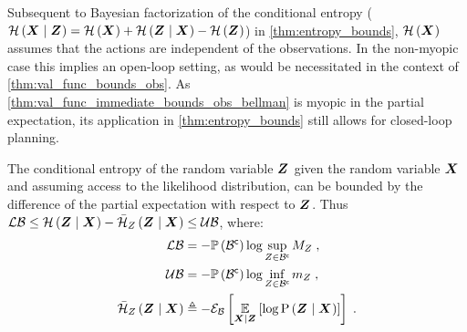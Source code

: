 Subsequent to Bayesian factorization of the conditional entropy ($\mathcal{H}\left({\boldsymbol X_{}}\mid{\ensuremath{\boldsymbol Z_{}}}\right)=\mathcal{H}\left({\boldsymbol X_{}}\right)+\mathcal{H}\left({\boldsymbol Z_{}}\mid{\ensuremath{\boldsymbol X_{}}}\right)-\mathcal{H}\left({\boldsymbol Z_{}}\right)$) in \cref{thm:entropy_bounds}, $\mathcal{H}\left({\boldsymbol X_{}}\right)$ assumes that the actions are independent of the observations. In the non-myopic case this implies an open-loop setting, as would be necessitated in the context of \cref{thm:val_func_bounds_obs}.  As \cref{thm:val_func_immediate_bounds_obs_bellman} is myopic in the partial expectation, its application in \cref{thm:entropy_bounds} still allows for closed-loop planning.

\begin{propositionE}
	\label{thm:observation_bounds}
	The conditional entropy of the random variable $\boldsymbol Z_{}$ given the random variable $\boldsymbol X_{}$ and assuming access to the likelihood distribution, can be bounded by the difference of the partial expectation with respect to $\boldsymbol Z_{}$. Thus $\operatorname*{\mathcal{LB}}\leq\mathcal{H}\left({\boldsymbol Z_{}}\mid{\ensuremath{\boldsymbol X_{}}}\right)-\bar{\mathcal{H}}_{Z_{}}\left({\boldsymbol Z_{}}\mid{\ensuremath{\boldsymbol X_{}}}\right)\leq\operatorname*{\mathcal{UB}}$, where:
	\begin{subequations}
		\begin{align}
			\operatorname*{\mathcal{LB}}&=-\mathbb{P}\left({{\mathcal B}^{\mathsf{c}}}\right)\log\sup_{Z_{}\in{\ensuremath{\mathcal B}}^{\mathsf{c}}}M_{Z_{}}\;,\\
			\operatorname*{\mathcal{UB}}& =-\mathbb{P}\left({{\mathcal B}^{\mathsf{c}}}\right)\log\inf_{Z_{}\in{\ensuremath{\mathcal B}}^{\mathsf{c}}}m_{Z_{}}\;,\\
			\bar{\mathcal{H}}_{Z_{}}\left({\boldsymbol Z_{}}\mid{\ensuremath{\boldsymbol X_{}}}\right) &\triangleq-\mathcal{E}_{\mathcal B}\left[{\operatorname*{\mathbb{E}}\limits_{\boldsymbol X_{}\mid\boldsymbol Z_{}}\left[{\log\mathrm{P}\left({\boldsymbol Z_{}}\mid{\ensuremath{\boldsymbol X_{}}}\right)}\right]}\right]\;.
		\end{align}
	\end{subequations}
\end{propositionE}
